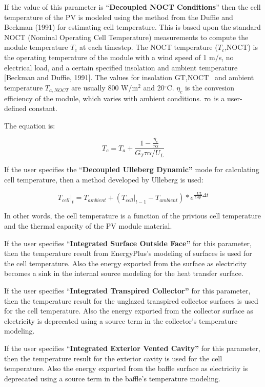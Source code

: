 If the value of this parameter is ``\textbf{Decoupled NOCT Conditions}'' then the cell temperature of the PV is modeled using the method from the Duffie and Beckman (1991) for estimating cell temperature. This is based upon the standard NOCT (Nominal Operating Cell Temperature) measurements to compute the module temperature \(T_c\) at each timestep. The NOCT temperature (\(T_c\),NOCT) is the operating temperature of the module with a wind speed of 1 m/s, no electrical load, and a certain specified insolation and ambient temperature {[}Beckman and Duffie, 1991{]}. The values for insolation GT,NOCT ~and ambient temperature \(T_{a,NOCT}\) are usually 800 W/m\(^{2}\) and 20\(^{\circ}\)C. \(\eta_{c}\) is the convesion efficiency of the module, which varies with ambient conditions. \({\tau \alpha}\) is a user-defined constant.

The equation is:

\begin{equation}
  T_c = T_a + \frac{1-\frac{\eta_c}{\tau \alpha}}{G_T \tau\alpha/U_L}
\end{equation}

If the user specifies the ``\textbf{Decoupled Ulleberg Dynamic''} mode for calculating cell temperature, then a method developed by Ulleberg is used:

\begin{equation}
{\left. {{T_{cell}}} \right|_t} = {T_{ambient}} + \left( {{{\left. {{T_{cell}}} \right|}_{t - 1}} - {T_{ambient}}} \right)*{e^{\frac{{ - UL}}{{Cap}}\Delta t}}
\end{equation}

In other words, the cell temperature is a function of the privious cell temperature and the thermal capacity of the PV module material.

If the user specifies ``\textbf{Integrated Surface Outside Face''} for this parameter, then the temperature result from EnergyPlus's modeling of surfaces is used for the cell temperature. Also the energy exported from the surface as electricity becomes a sink in the internal source modeling for the heat transfer surface.

If the user specifies ``\textbf{Integrated Transpired Collector''} for this parameter, then the temperature result for the unglazed transpired collector surfaces is used for the cell temperature. Also the energy exported from the collector surface as electricity is deprecated using a source term in the collector's temperature modeling.

If the user specifies ``\textbf{Integrated Exterior Vented Cavity''} for this parameter, then the temperature result for the exterior cavity is used for the cell temperature. Also the energy exported from the baffle surface as electricity is deprecated using a source term in the baffle's temperature modeling.

